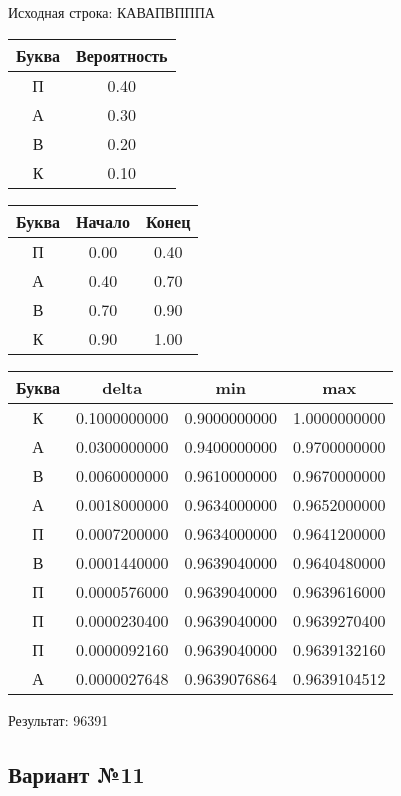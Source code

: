 \documentclass[a4paper, 12pt]{article}
\begin{document}
Исходная строка: КАВАПВПППА\
\begin{center}
 \begin{tabular}{ |c|c| } 
  \hline
     Буква & Вероятность \\ \hline
П & 0.40\\\hline
А & 0.30\\\hline
В & 0.20\\\hline
К & 0.10
\\ \hline \end{tabular}
\end{center}
\begin{center}
 \begin{tabular}{ |c|c|c| } 
  \hline
     Буква & Начало & Конец \\ \hline
П & 0.00 & 0.40\\\hline
А & 0.40 & 0.70\\\hline
В & 0.70 & 0.90\\\hline
К & 0.90 & 1.00
\\ \hline \end{tabular}
\end{center}
\begin{center}
 \begin{tabular}{ |c|c|c|c| } 
  \hline
     Буква & delta & min & max \\ \hline
К & 0.1000000000 & 0.9000000000 & 1.0000000000\\\hline
А & 0.0300000000 & 0.9400000000 & 0.9700000000\\\hline
В & 0.0060000000 & 0.9610000000 & 0.9670000000\\\hline
А & 0.0018000000 & 0.9634000000 & 0.9652000000\\\hline
П & 0.0007200000 & 0.9634000000 & 0.9641200000\\\hline
В & 0.0001440000 & 0.9639040000 & 0.9640480000\\\hline
П & 0.0000576000 & 0.9639040000 & 0.9639616000\\\hline
П & 0.0000230400 & 0.9639040000 & 0.9639270400\\\hline
П & 0.0000092160 & 0.9639040000 & 0.9639132160\\\hline
А & 0.0000027648 & 0.9639076864 & 0.9639104512
\\ \hline \end{tabular}
\end{center}
Результат: 96391
\pagebreak
\subsection{Вариант №11}
\end{document}
